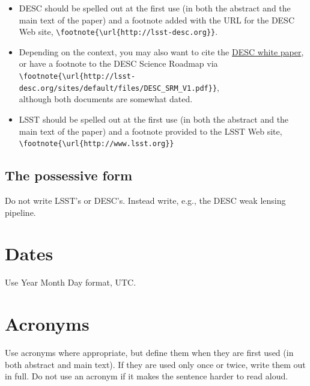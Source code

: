\documentclass[letterpaper,11pt]{article}
\begin{document}
\begin{itemize}
\item{DESC should be spelled out at the first use (in both the abstract and the main text of the paper) and a footnote added with the URL for the DESC Web site, \verb|\footnote{\url{http://lsst-desc.org}}|.}
  
\item{Depending on the context, you may also want to cite the \href{http://adsabs.harvard.edu/abs/2012arXiv1211.0310L}{DESC white paper}, or have a footnote to the DESC Science Roadmap via \\\verb|\footnote{\url{http://lsst-desc.org/sites/default/files/DESC_SRM_V1.pdf}}|, \\although both documents are somewhat dated.}

\item{LSST should be spelled out at the first use (in both the abstract and the main text of the paper) and a footnote provided to the LSST Web site, \verb|\footnote{\url{http://www.lsst.org}}|}

\end{itemize}



\subsection{The possessive form}

Do not write LSST's or DESC's.  Instead write, e.g., the DESC weak lensing pipeline.

\section{Dates}

Use Year Month Day format, UTC.


\section{Acronyms}

Use acronyms where appropriate, but define them when they are first used
(in both
abstract and main text).  If they are used only once or twice, write them out
in full.  Do not use an acronym if it makes the sentence harder to read aloud.
\end{document}
